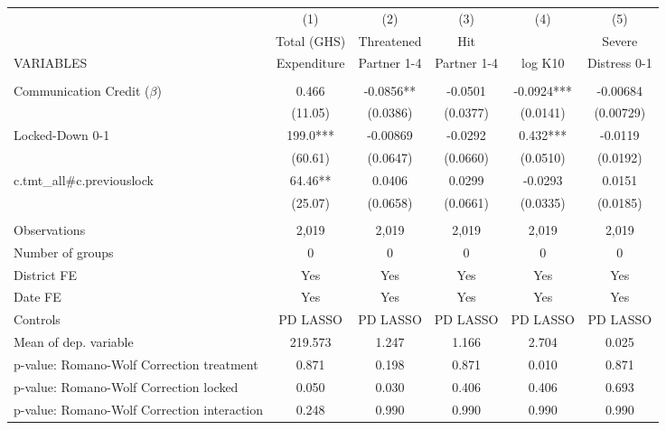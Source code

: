 \begin{tabular}{lccccc} \hline
 & (1) & (2) & (3) & (4) & (5) \\
 & Total (GHS) & Threatened & Hit &  & Severe \\
VARIABLES & Expenditure & Partner 1-4 & Partner 1-4 & log K10 & Distress 0-1 \\ \hline
 &  &  &  &  &  \\
Communication Credit ($\beta$) & 0.466 & -0.0856** & -0.0501 & -0.0924*** & -0.00684 \\
 & (11.05) & (0.0386) & (0.0377) & (0.0141) & (0.00729) \\
Locked-Down 0-1 & 199.0*** & -0.00869 & -0.0292 & 0.432*** & -0.0119 \\
 & (60.61) & (0.0647) & (0.0660) & (0.0510) & (0.0192) \\
c.tmt\_all\#c.previouslock & 64.46** & 0.0406 & 0.0299 & -0.0293 & 0.0151 \\
 & (25.07) & (0.0658) & (0.0661) & (0.0335) & (0.0185) \\
 &  &  &  &  &  \\
Observations & 2,019 & 2,019 & 2,019 & 2,019 & 2,019 \\
Number of groups & 0 & 0 & 0 & 0 & 0 \\
District FE & Yes & Yes & Yes & Yes & Yes \\
Date FE & Yes & Yes & Yes & Yes & Yes \\
Controls & PD LASSO & PD LASSO & PD LASSO & PD LASSO & PD LASSO \\
Mean of dep. variable & 219.573 & 1.247 & 1.166 & 2.704 & 0.025 \\
p-value: Romano-Wolf Correction treatment & 0.871 & 0.198 & 0.871 & 0.010 & 0.871 \\
p-value: Romano-Wolf Correction locked & 0.050 & 0.030 & 0.406 & 0.406 & 0.693 \\
 p-value: Romano-Wolf Correction interaction & 0.248 & 0.990 & 0.990 & 0.990 & 0.990 \\ \hline
\end{tabular}
